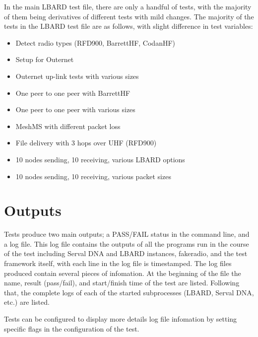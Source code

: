In the main LBARD test file, there are only a handful of tests, with the majority of them being derivatives of different tests with mild changes. 
The majority of the tests in the LBARD test file are as follows, with slight difference in test variables:
\begin{itemize}
    \item Detect radio types (RFD900, BarrettHF, CodanHF)
    \item Setup for Outernet
    \item Outernet up-link tests with various sizes
    \item One peer to one peer with BarrettHF
    \item One peer to one peer with various sizes
    \item MeshMS with different packet loss
    \item File delivery with 3 hops over UHF (RFD900)
    \item 10 nodes sending, 10 receiving, various LBARD options
    \item 10 nodes sending, 10 receiving, various packet sizes
\end{itemize}




\section{Outputs}
Tests produce two main outputs; a PASS/FAIL status in the command line, and a log file.
This log file contains the outputs of all the programs run in the course of the test including Serval DNA and LBARD instances, fakeradio, and the test framework itself, with each line in the log file is timestamped.
The log files produced contain several pieces of infomation.
At the beginning of the file the name, result (pass/fail), and start/finish time of the test are listed.
Following that, the complete logs of each of the started subprocesses (LBARD, Serval DNA, etc.) are listed.

Tests can be configured to display more details log file infomation by setting specific flags in the configuration of the test.

